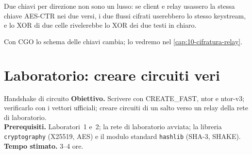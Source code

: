 Due chiavi per direzione non sono un lusso: se client e relay usassero la stessa chiave AES-CTR nei due versi, i due flussi cifrati userebbero lo stesso keystream, e lo XOR di due celle rivelerebbe lo XOR dei due testi in chiaro.

Con CGO lo schema delle chiavi cambia; lo vedremo nel \cref{cap:10-cifratura-relay}.

\section{Laboratorio: creare circuiti veri}\label{sec:lab-circuiti}

\begin{laboratorio}[3]{Handshake di circuito}
\textbf{Obiettivo.} Scrivere  con CREATE\_FAST, ntor e ntor-v3; verificarlo con i vettori ufficiali; creare circuiti di un salto verso un relay della rete di laboratorio.\\
\textbf{Prerequisiti.} Laboratori~1 e~2; la rete di laboratorio avviata; la libreria \texttt{cryptography} (X25519, AES) e il modulo standard \texttt{hashlib} (SHA-3, SHAKE).\\
\textbf{Tempo stimato.} 3--4 ore.
\end{laboratorio}

